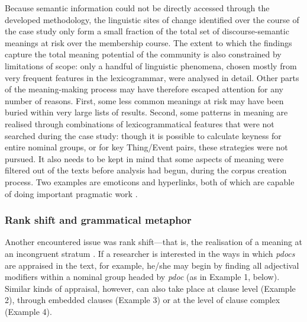 Because semantic information could not be directly accessed through the developed methodology, the linguistic sites of change identified over the course of the case study only form a small fraction of the total set of \gls{discourse-semantic} meanings at risk over the membership course. The extent to which the findings capture the total meaning potential of the community is also constrained by limitations of scope: only a handful of linguistic phenomena, chosen mostly from very frequent features in the \gls{lexicogrammar}, were analysed in detail. Other parts of the meaning\hyp{}making process may have therefore escaped attention for any number of reasons. First, some less common meanings at risk may have been buried within very large lists of results. Second, some patterns in meaning are realised through combinations of lexicogrammatical features that were not searched during the case study: though it is possible to calculate keyness for entire nominal groups, or for key Thing\slash Event pairs, these strategies were not pursued. It also needs to be kept in mind that some aspects of meaning were filtered out of the texts before analysis had begun, during the \gls{corpus} creation process. Two examples are emoticons and hyperlinks, both of which are capable of doing important pragmatic work \cite{koteyko2015performing,schandorf_mediated_2013}.

\subsubsection{Rank shift and grammatical metaphor}

Another encountered issue was rank shift---that is, the realisation of a meaning at an incongruent stratum \cite{halliday_introduction_2004}. If a researcher is interested in the ways in which \emph{pdocs} are appraised in the text, for example, he\slash she may begin by finding all adjectival modifiers within a nominal group headed by \emph{pdoc} (as in Example 1, below). Similar kinds of appraisal, however, can also take place at clause level (Example 2), through embedded clauses (Example 3) or at the level of clause complex (Example 4).

